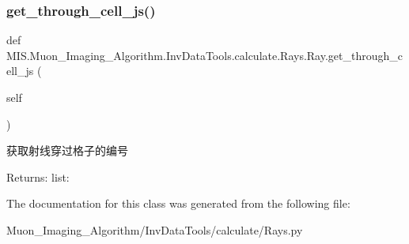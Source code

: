 \subsubsection{\texorpdfstring{get\+\_\+through\+\_\+cell\+\_\+js()}{get\_through\_cell\_js()}}
{\footnotesize\ttfamily def M\+I\+S.\+Muon\+\_\+\+Imaging\+\_\+\+Algorithm.\+Inv\+Data\+Tools.\+calculate.\+Rays.\+Ray.\+get\+\_\+through\+\_\+cell\+\_\+js (\begin{DoxyParamCaption}\item[{}]{self }\end{DoxyParamCaption})}

\begin{DoxyVerb}获取射线穿过格子的编号

Returns:
    list: 
\end{DoxyVerb}
 

The documentation for this class was generated from the following file\+:\begin{DoxyCompactItemize}
\item 
Muon\+\_\+\+Imaging\+\_\+\+Algorithm/\+Inv\+Data\+Tools/calculate/Rays.\+py\end{DoxyCompactItemize}
